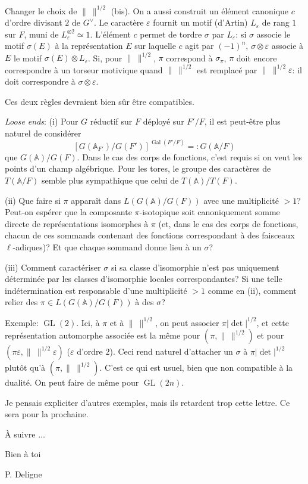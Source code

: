 \documentclass[11pt]{article}
\newcommand{\GL}{\operatorname{GL}}
\newcommand{\Gal}{\operatorname{Gal}}
\newcommand{\normchar}{\|\ \|}
\begin{document}
Changer le choix de \(\normchar^{1/2}\) (bis). On a aussi construit un élément canonique \(c\) d'ordre divisant \(2\) de \(G^\vee\). Le caractère \(\varepsilon\) fournit un motif (d'Artin) \(L_\varepsilon\) de rang \(1\) sur \(F\), muni de \(L_\varepsilon^{\otimes2}\simeq1\). L'élément \(c\) permet de tordre \(\sigma\) par \(L_\varepsilon\): si \(\sigma\) associe le motif \(\sigma(E)\) à la représentation \(E\) sur laquelle \(c\) agit par \((-1)^n\), \(\sigma\otimes\varepsilon\) associe à \(E\) le motif \(\sigma(E)\otimes L_\varepsilon\). Si, pour \(\normchar^{1/2}\), \(\pi\) correspond à \(\sigma_\pi\), \(\pi\) doit encore correspondre à un torseur motivique quand \(\normchar^{1/2}\) est remplacé par \(\normchar^{1/2}\varepsilon\): il doit correspondre à \(\sigma\otimes\varepsilon\).

Ces deux règles devraient bien sûr être compatibles.

\textit{Loose ends}: (i) Pour \(G\) réductif sur \(F\) déployé sur \(F'/F\), il est peut-être plus naturel de considérer
\[
[G(\mathbb A_{F'})/G(F')]^{\Gal(F'/F)}=:G(\mathbb A/F)
\]
que \(G(\mathbb A)/G(F)\). Dans le cas des corps de fonctions, c'est requis si on veut les points d'un champ algébrique. Pour les tores, le groupe des caractères de \(T(\mathbb A/F)\) semble plus sympathique que celui de \(T(\mathbb A)/T(F)\).

(ii) Que faire si \(\pi\) apparaît dans \(L(G(\mathbb A)/G(F))\) avec une multiplicité \(>1\)? Peut-on espérer que la composante \(\pi\)-isotopique soit canoniquement somme directe de représentations isomorphes à \(\pi\) (et, dans le cas des corps de fonctions, chacun de ces sommands contenant des fonctions correspondant à des faisceaux \(\ell\)-adiques)? Et que chaque sommand donne lieu à un \(\sigma\)?

(iii) Comment caractériser \(\sigma\) si sa classe d'isomorphie n'est pas uniquement déterminée par les classes d'isomorphie locales correspondantes? Si une telle indétermination est responsable d'une multiplicité \(>1\) comme en (ii), comment relier des \(\pi\in L(G(\mathbb A)/G(F))\) à des \(\sigma\)?

Exemple: \(\GL(2)\). Ici, à \(\pi\) et à \(\normchar^{1/2}\), on peut associer \(\pi|\det|^{1/2}\), et cette représentation automorphe associée est la même pour \((\pi,\normchar^{1/2})\) et pour \((\pi\varepsilon,\normchar^{1/2}\varepsilon)\) (\(\varepsilon\) d'ordre \(2\)). Ceci rend naturel d'attacher un \(\sigma\) à \(\pi|\det|^{1/2}\) plutôt qu'à \((\pi,\normchar^{1/2})\). C'est ce qui est usuel, bien que non compatible à la dualité. On peut faire de même pour \(\GL(2n)\).

Je pensais expliciter d'autres exemples, mais ils retardent trop cette lettre. Ce sera pour la prochaine.

\begin{center}
À suivre \(\ldots\)

Bien à toi

P. Deligne
\end{center}
\end{document}
